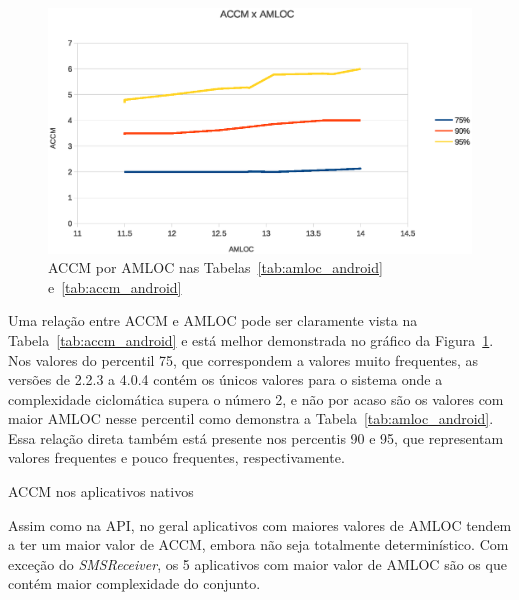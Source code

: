 \begin{figure}[!htb]
\centering
\includegraphics [keepaspectratio=true,scale=0.85]{figuras/ACCMxAMLOC.eps}
\caption{ACCM por AMLOC nas Tabelas~\ref{tab:amloc_android} e~\ref{tab:accm_android}}
\label{fig:accmxamloc}
\end{figure}

Uma relação entre ACCM e AMLOC pode ser claramente vista na Tabela~\ref{tab:accm_android} e está melhor demonstrada no gráfico da Figura~\ref{fig:accmxamloc}. Nos valores do percentil 75, que correspondem a valores muito frequentes, as versões de 2.2.3 a 4.0.4 contém os únicos valores para o sistema onde a complexidade ciclomática supera o número 2, e não por acaso são os valores com maior AMLOC nesse percentil como demonstra a Tabela~\ref{tab:amloc_android}. Essa relação direta também está presente nos percentis 90 e 95, que representam valores frequentes e pouco frequentes, respectivamente.

\begin{table}[!htb]
\centering
{}

\caption{ACCM nos aplicativos nativos}
\label{tab:accm_apps}
\end{table}

Assim como na API, no geral aplicativos com maiores valores de AMLOC tendem a ter um maior valor de ACCM, embora não seja totalmente determinístico. Com exceção do \textit{SMSReceiver}, os 5 aplicativos com maior valor de AMLOC são os que contém maior complexidade do conjunto. 

